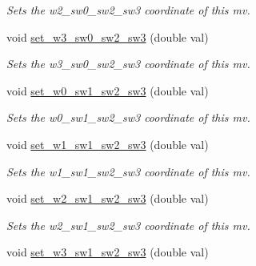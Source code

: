\begin{DoxyCompactItemize}
\begin{DoxyCompactList}\small\item\em Sets the w2\-\_\-sw0\-\_\-sw2\-\_\-sw3 coordinate of this mv. \end{DoxyCompactList}\item 
\hypertarget{classe3ga_1_1mv_aa6df2d615d9c1ba9a13234f5b21012ee}{void \hyperlink{classe3ga_1_1mv_aa6df2d615d9c1ba9a13234f5b21012ee}{set\-\_\-w3\-\_\-sw0\-\_\-sw2\-\_\-sw3} (double val)}\label{classe3ga_1_1mv_aa6df2d615d9c1ba9a13234f5b21012ee}

\begin{DoxyCompactList}\small\item\em Sets the w3\-\_\-sw0\-\_\-sw2\-\_\-sw3 coordinate of this mv. \end{DoxyCompactList}\item 
\hypertarget{classe3ga_1_1mv_ae79e280fd52636f2433871dbc4545662}{void \hyperlink{classe3ga_1_1mv_ae79e280fd52636f2433871dbc4545662}{set\-\_\-w0\-\_\-sw1\-\_\-sw2\-\_\-sw3} (double val)}\label{classe3ga_1_1mv_ae79e280fd52636f2433871dbc4545662}

\begin{DoxyCompactList}\small\item\em Sets the w0\-\_\-sw1\-\_\-sw2\-\_\-sw3 coordinate of this mv. \end{DoxyCompactList}\item 
\hypertarget{classe3ga_1_1mv_ae0b49b30a6a5dcee83f6ce3cf032c793}{void \hyperlink{classe3ga_1_1mv_ae0b49b30a6a5dcee83f6ce3cf032c793}{set\-\_\-w1\-\_\-sw1\-\_\-sw2\-\_\-sw3} (double val)}\label{classe3ga_1_1mv_ae0b49b30a6a5dcee83f6ce3cf032c793}

\begin{DoxyCompactList}\small\item\em Sets the w1\-\_\-sw1\-\_\-sw2\-\_\-sw3 coordinate of this mv. \end{DoxyCompactList}\item 
\hypertarget{classe3ga_1_1mv_ac7a0271ca2d2047defe8cf0fba4654c6}{void \hyperlink{classe3ga_1_1mv_ac7a0271ca2d2047defe8cf0fba4654c6}{set\-\_\-w2\-\_\-sw1\-\_\-sw2\-\_\-sw3} (double val)}\label{classe3ga_1_1mv_ac7a0271ca2d2047defe8cf0fba4654c6}

\begin{DoxyCompactList}\small\item\em Sets the w2\-\_\-sw1\-\_\-sw2\-\_\-sw3 coordinate of this mv. \end{DoxyCompactList}\item 
\hypertarget{classe3ga_1_1mv_a5e12b950201d90e41199c53bbfd3175a}{void \hyperlink{classe3ga_1_1mv_a5e12b950201d90e41199c53bbfd3175a}{set\-\_\-w3\-\_\-sw1\-\_\-sw2\-\_\-sw3} (double val)}\label{classe3ga_1_1mv_a5e12b950201d90e41199c53bbfd3175a}


\end{DoxyCompactItemize}

